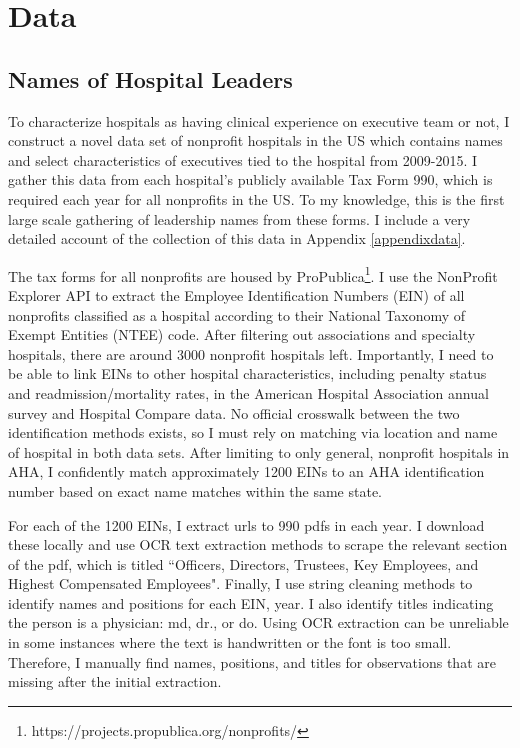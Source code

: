 \documentclass[12pt]{article}
\begin{document}
  
	
	\section{Data}\label{sec:data}

    \subsection{Names of Hospital Leaders}

    To characterize hospitals as having clinical experience on executive team or not, I construct a novel data set of nonprofit hospitals in the US which contains names and select characteristics of executives tied to the hospital from 2009-2015. I gather this data from each hospital's publicly available Tax Form 990, which is required each year for all nonprofits in the US. To my knowledge, this is the first large scale gathering of leadership names from these forms. I include a very detailed account of the collection of this data in Appendix \ref{appendixdata}.

    The tax forms for all nonprofits are housed by ProPublica\footnote{https://projects.propublica.org/nonprofits/}. I use the NonProfit Explorer API to extract the Employee Identification Numbers (EIN) of all nonprofits classified as a hospital according to their National Taxonomy of Exempt Entities (NTEE) code. After filtering out associations and specialty hospitals, there are around 3000 nonprofit hospitals left. Importantly, I need to be able to link EINs to other hospital characteristics, including penalty status and readmission/mortality rates, in the American Hospital Association annual survey and Hospital Compare data. No official crosswalk between the two identification methods exists, so I must rely on matching via location and name of hospital in both data sets. After limiting to only general, nonprofit hospitals in AHA, I confidently match approximately 1200 EINs to an AHA identification number based on exact name matches within the same state. 
    
    For each of the 1200 EINs, I extract urls to 990 pdfs in each year. I download these locally and use OCR text extraction methods to scrape the relevant section of the pdf, which is titled ``Officers, Directors, Trustees, Key Employees, and Highest Compensated Employees". Finally, I use string cleaning methods to identify names and positions for each EIN, year. I also identify titles indicating the person is a physician: md, dr., or do. Using OCR extraction can be unreliable in some instances where the text is handwritten or the font is too small. Therefore, I manually find names, positions, and titles for observations that are missing after the initial extraction.
\end{document}
